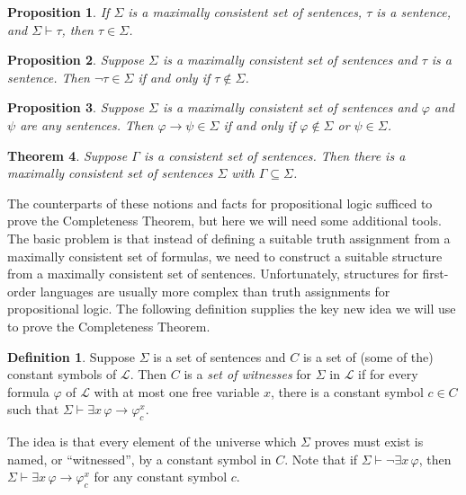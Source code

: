 \documentclass[12pt]{amsbook}
\newcommand{\proves}{\vdash}
\theoremstyle{plain}
\newtheorem{thm}{Theorem}[chapter]
\newtheorem{prop}[thm]{Proposition}
\theoremstyle{definition}
\newtheorem{defn}{Definition}[chapter]
\theoremstyle{remark}
\begin{document}
\begin{prop} \label{p:eight8}
If $\Sigma$ is a maximally consistent set of sentences,  $\tau$ is a sentence,  and $\Sigma \proves \tau$,  then $\tau \in \Sigma$.
\end{prop}

\begin{prop} \label{p:eight9}
Suppose $\Sigma$ is a maximally consistent set of sentences and $\tau$ is a sentence.  Then $\lnot\tau \in \Sigma$ if and only if $\tau \notin \Sigma$.
\end{prop}

\begin{prop} \label{p:eight10}
Suppose $\Sigma$ is a maximally consistent set of sentences and $\varphi$ and $\psi$ are any sentences.  Then $\varphi \to \psi \in \Sigma$ if and only if $\varphi \notin \Sigma$ or $\psi \in \Sigma$.
\end{prop}

\begin{thm} \label{t:etmc}
Suppose $\Gamma$ is a consistent set of sentences.  Then there is a maximally consistent set of sentences $\Sigma$ with $\Gamma \subseteq \Sigma$.
\end{thm}

The counterparts of these notions and facts for propositional logic sufficed to prove the Completeness Theorem,  but here we will need some additional tools.  The basic problem is that instead of defining a suitable truth assignment from a maximally consistent set of formulas,  we need to construct a suitable structure from a maximally consistent set of sentences.  Unfortunately,  structures for first-order languages are usually more complex than truth assignments for propositional logic.
The following definition supplies the key new idea we will use to prove the Completeness Theorem.  

\begin{defn} 
Suppose $\Sigma$ is a set of sentences and $C$ is a set of (some of the) constant symbols of $\mathcal{L}$.  Then $C$ is a {\em set of witnesses\/} for $\Sigma$ in $\mathcal{L}$ if for every formula $\varphi$ of $\mathcal{L}$ with at most one free variable $x$,  there is a constant symbol $c \in C$ such that $\Sigma \proves \exists x\, \varphi \to \varphi^x_c$.
\end{defn}

The idea is that every element of the universe which $\Sigma$ proves must exist is named,  or ``witnessed'',  by a constant symbol in $C$.  Note that if $\Sigma \proves \lnot \exists x\, \varphi$,  then $\Sigma \proves \exists x\, \varphi \to \varphi^x_c$ for any constant symbol $c$.
\end{document}
